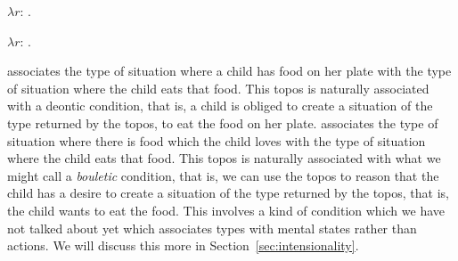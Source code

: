 \begin{ex} 
\begin{subex} 
 
\item $\lambda r$: . 
 
\item $\lambda r$: . 
 
\end{subex} 
\label{ex:topoi-eat-up-eat-like}   
\end{ex} 
 associates the type of situation where a child has food on
her plate with the type of situation where the child eats that food.
This topos is naturally associated with a deontic condition, that is,
a child is obliged to create a situation of the type returned by the
topos, to eat the food on her plate.   associates
the type of situation where there is food which the child loves with
the type of situation where the child eats that food.  This topos is
naturally associated with what we might call a \textit{bouletic}
condition, that is, we can use the topos to reason that the child has
a desire to create a situation of the type returned by the topos, that
is, the child wants to eat the food.  This involves a
kind of condition which we have not talked about yet which associates
types with mental states rather than actions.  We will discuss this
more in Section~\ref{sec:intensionality}.

